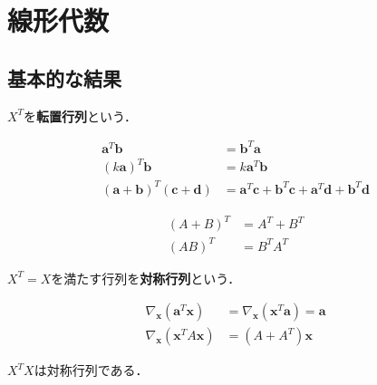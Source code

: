 \chapter{線形代数}

\section{基本的な結果}

\begin{defi}
$X^T$を{\bf 転置行列}という．	
\end{defi}

\begin{theo}
\begin{align}
{\bm a}^T{\bm b}&= {\bm b}^T{\bm a}	\\
(k{\bm a})^T{\bm b}&= k{\bm a}^T{\bm b} \\
({\bm a}+{\bm b})^T({\bm c}+{\bm d})&= {\bm a}^T{\bm c}+{\bm b}^T{\bm c}+{\bm a}^T{\bm d}+{\bm b}^T{\bm d}
\end{align}
\end{theo}

\begin{theo}
\begin{align}
(A+B)^T&= A^T+B^T \\
(AB)^T&=B^TA^T	
\end{align}
\end{theo}

\begin{defi}
$X^T=X$を満たす行列を{\bf 対称行列}という．	
\end{defi}

\begin{theo}
\begin{align}
\nabla_{{\bm x}}({\bm a}^T {\bm x})&=\nabla_{{\bm x}}({\bm x}^T {\bm a})={\bm a}\\
\nabla_{{\bm x}}({\bm x}^T A{\bm x})&=(A+A^T){\bm x}
\end{align}
\end{theo}

\begin{theo}
$X^TX$は対称行列である．
\end{theo}
